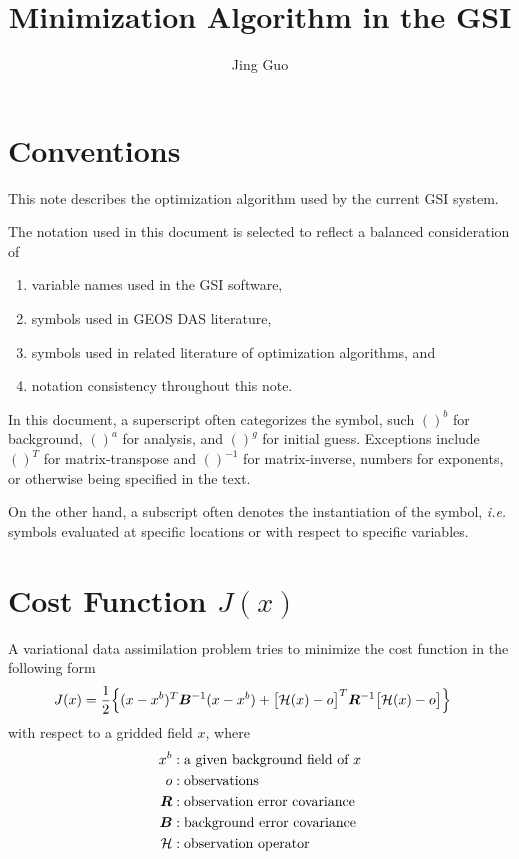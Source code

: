 \documentclass{article}
\title{Minimization Algorithm in the GSI}
\author{Jing Guo}
\begin{document}
\maketitle

\section{Conventions}
This note describes the
optimization algorithm used by the current GSI system.

The notation used in this document
is selected to reflect a balanced consideration of
\begin{enumerate}
\item variable names used in the GSI software,
\item symbols used in GEOS DAS literature,
\item symbols used in related literature of optimization algorithms, and
\item notation consistency throughout this note.
\end{enumerate}

In this document, a superscript often categorizes the symbol, such
$()^b$ for background,
$()^a$ for analysis, and
$()^g$ for initial guess.
Exceptions
include $()^T$ for matrix-transpose and $()^{-1}$ for matrix-inverse,
numbers for exponents, or otherwise being specified in the text.

On the other hand, a subscript often denotes the instantiation of the
symbol, {\it i.e.} symbols evaluated at specific locations or with
respect to specific variables.

\section{Cost Function $J(x)$}
A variational data assimilation problem tries to minimize the
cost function in the following form
\begin{align}	\label{eq:cost-in-x}
J(x) &= {\frac{1}{2}}
  \Bigl\{
	(x-x^b)^T
	\bm B^{-1}
	(x-x^b)
	+
	\bigl[ {\mathcal H}(x) - o \bigr]^T
	\bm R^{-1}
	\bigl[ {\mathcal H}(x) - o \bigr]
  \Bigr\}
\end{align}
with respect to a gridded field $x$,
where
\begin{align*}
  x^b &: \text{a given background field of $x$}		\\
  o &: \text{observations}				\\
  \bm R &: \text{observation error covariance}		\\
  \bm B &: \text{background error covariance}		\\
  {\mathcal H} &: \text{observation operator}
\end{align*}
\end{document}
